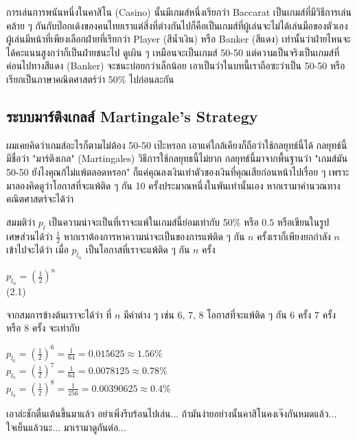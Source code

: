 \documentclass[12pt]{article}
\begin{document}
การเล่นการพนันหนึ่งในคาสิโน (Casino) นั้นมีเกมส์หนึ่งเรียกว่า Baccarat เป็นเกมส์ที่มีวิธีการเล่นคล้าย ๆ กันกับป๊อกเด้งของคนไทยเราแต่สิ่งที่ต่างกันไปก็คือเป็นเกมส์ที่ผู้เล่นจะไม่ได้เล่นมือของตัวเอง ผู้เล่นมีหน้าที่เพียงเลือกฝ่ายที่เรียกว่า Player (สีน้ำเงิน) หรือ Banker (สีแดง) เท่านั้นว่าฝ่ายไหนจะได้คะแนนสูงกว่าก็เป็นฝ่ายชนะไป ดูเผิน ๆ เหมือนจะเป็นเกมส์ 50-50 แต่ความเป็นจริงเป็นเกมส์ที่ค่อนไปทางสีแดง (Banker) จะชนะบ่อยกว่าเล็กน้อย เอาเป็นว่าในบทนี้เราถือซะว่าเป็น 50-50 หรือเรียกเป็นภาษาคณิตศาสตร์ว่า 50\% ไปก่อนละกัน

\subsection{ระบบมาร์ติงเกลส์ Martingale's Strategy}
ผมเคยคิดว่าเกมส์อะไรก็ตามไม่ต้อง 50-50 เป๊ะหรอก เอาแค่ใกล้เคียงก็ถือว่าใช้กลยุทธ์นี้ได้ กลยุทธ์นี้มีชื่อว่า "มาร์ติงเกล" (Martingales) วิธีการใช้กลยุทธนี้ไม่ยาก กลยุทธ์นี้มาจากพื้นฐานว่า "เกมส์มัน 50-50 ยังไงคุณก้ไม่แพ้ตลอดหรอก" ก็แค่คุณลงเงินเท่าตัวของเงินที่คุณเสียก่อนหน้าไปเรื่อย ๆ เพราะมาลองคิดดูว่าโอกาสที่จะแพ้ติด ๆ กัน 10 ครั้งประมาณหนึ่งในพันเท่านั้นเอง หากเรามาคำนวณทางคณิตศาสตร์จะได้ว่า

สมมติว่า $p_l$ เป็นความน่าจะเป็นที่เราจะแพ้ในเกมส์นี้ย่อมเท่ากับ 50\% หรือ $0.5$ หรือเขียนในรูปเศษส่วนได้ว่า $\frac{1}{2}$ หากเราต้องการหาความน่าจะเป็นของการแพ้ติด ๆ กัน $n$ ครั้งเราก็เพียงยกกำลัง $n$ เข้าไปจะได้ว่า เมื่อ $p_{l_n}$ เป็นโอกาสที่เราจะแพ้ติด ๆ กัน $n$ ครั้ง
\begin{center}
$p_{l_n} = (\frac{1}{2})^n$ \\
(2.1)
\end{center}
จากสมการข้างต้นเราจะได้ว่า ที่ $n$ มีค่าต่าง ๆ เช่น 6, 7, 8 โอกาสที่จะแพ้ติด ๆ กัน 6 ครั้ง 7 ครั้ง หรือ 8 ครั้ง จะเท่ากับ
\begin{center}
$p_{l_6}=(\frac{1}{2})^6=\frac{1}{64}=0.015625\approx1.56\%$\\
$p_{l_7}=(\frac{1}{2})^7=\frac{1}{64}=0.0078125\approx0.78\%$\\
$p_{l_8}=(\frac{1}{2})^8=\frac{1}{256}=0.00390625\approx0.4\%$\\ 
\end{center}
เอาล่ะชักตื่นเต้นขึ้นมาแล้ว อย่าเพิ่งรีบร้อนไปเล่น... ถ้ามันง่ายอย่างนั้นคาสิโนคงเจ๊งกันหมดแล้ว... ใจเย็นแล้วนะ... มาเรามาดูกันต่อ... 
\end{document}
